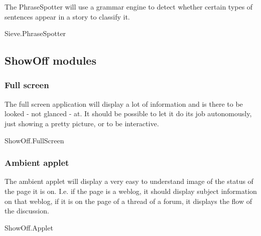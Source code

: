 The PhraseSpotter will use a grammar engine to detect whether certain types of
sentences appear in a story to classify it.

\begin{module}{Sieve.PhraseSpotter}
\end{module}

\subsection{ShowOff modules}

\subsubsection{Full screen}

The full screen application will display a lot of information and is there to
be looked - not glanced - at. It should be possible to let it do its job
autonomously, just showing a pretty picture, or to be interactive.

\begin{module}{ShowOff.FullScreen}
\end{module}

\subsubsection{Ambient applet}

The ambient applet will display a very easy to understand image of the status
of the page it is on. I.e. if the page is a weblog, it should display subject
information on that weblog, if it is on the page of a thread of a forum, it
displays the flow of the discussion.

\begin{module}{ShowOff.Applet}
\end{module}

